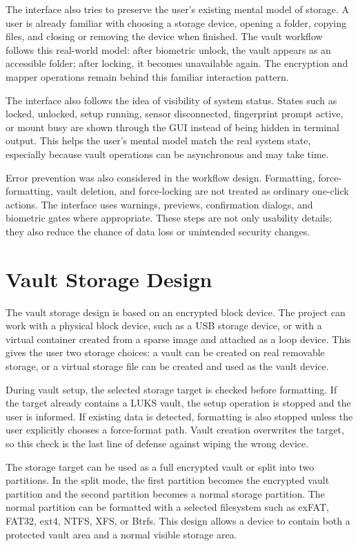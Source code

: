 The interface also tries to preserve the user's existing mental model of storage. A user is already familiar with choosing a storage device, opening a folder, copying files, and closing or removing the device when finished. The vault workflow follows this real-world model: after biometric unlock, the vault appears as an accessible folder; after locking, it becomes unavailable again. The encryption and mapper operations remain behind this familiar interaction pattern.

The interface also follows the idea of visibility of system status. States such as locked, unlocked, setup running, sensor disconnected, fingerprint prompt active, or mount busy are shown through the GUI instead of being hidden in terminal output. This helps the user's mental model match the real system state, especially because vault operations can be asynchronous and may take time.

Error prevention was also considered in the workflow design. Formatting, force-formatting, vault deletion, and force-locking are not treated as ordinary one-click actions. The interface uses warnings, previews, confirmation dialogs, and biometric gates where appropriate. These steps are not only usability details; they also reduce the chance of data loss or unintended security changes.

\section{Vault Storage Design}

The vault storage design is based on an encrypted block device. The project can work with a physical block device, such as a USB storage device, or with a virtual container created from a sparse image and attached as a loop device. This gives the user two storage choices: a vault can be created on real removable storage, or a virtual storage file can be created and used as the vault device.

During vault setup, the selected storage target is checked before formatting. If the target already contains a LUKS vault, the setup operation is stopped and the user is informed. If existing data is detected, formatting is also stopped unless the user explicitly chooses a force-format path. Vault creation overwrites the target, so this check is the last line of defense against wiping the wrong device.

The storage target can be used as a full encrypted vault or split into two partitions. In the split mode, the first partition becomes the encrypted vault partition and the second partition becomes a normal storage partition. The normal partition can be formatted with a selected filesystem such as exFAT, FAT32, ext4, NTFS, XFS, or Btrfs. This design allows a device to contain both a protected vault area and a normal visible storage area.

